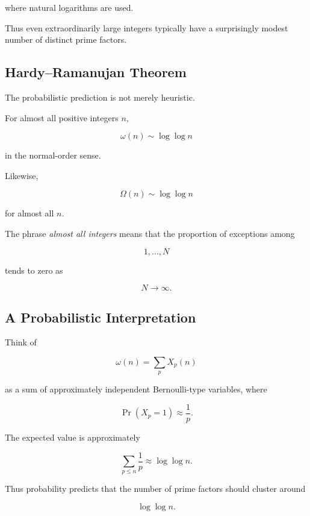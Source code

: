 where natural logarithms are used.

Thus even extraordinarily large integers typically have a surprisingly
modest number of distinct prime factors.

\subsection{Hardy--Ramanujan Theorem}
\label{subsec:hardy-ramanujan-theorem}

The probabilistic prediction is not merely heuristic.

\begin{theorem}
For almost all positive integers \(n\),

\[ \boxed{\omega(n)\sim\log\log n} \]

in the normal-order sense.

Likewise,

\[ \boxed{\Omega(n)\sim\log\log n} \]

for almost all \(n\).
\end{theorem}

The phrase \emph{almost all integers} means that the proportion of exceptions
among

\[ 1,\ldots,N \]

tends to zero as

\[ N\to\infty. \]

\subsection{A Probabilistic Interpretation}
\label{subsec:hardy-ramanujan-probabilistic}

Think of

\[ \omega(n)=\sum_p X_p(n) \]

as a sum of approximately independent Bernoulli-type variables, where

\[ \Pr(X_p=1)\approx\frac1p. \]

The expected value is approximately

\[ \sum_{p\leq n}\frac1p\approx\log\log n. \]

Thus probability predicts that the number of prime factors should cluster
around

\[ \log\log n. \]

